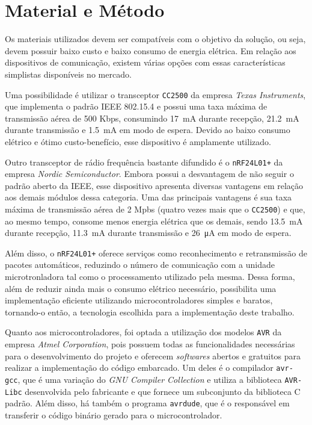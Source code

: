 \documentclass[
    12pt,               %
    a4paper,            %
    english,            %
    brazil,             %
    ]{article}
\begin{document}
\section{Material e Método}

Os materiais utilizados devem ser compatíveis com o objetivo da solução, ou seja, devem possuir baixo custo e baixo consumo de
energia elétrica. Em relação aos dispositivos de comunicação, existem várias opções com essas características simplistas
disponíveis no mercado.

Uma possibilidade é utilizar o transceptor \texttt{CC2500} da empresa \textit{Texas Instruments}, que implementa o padrão IEEE
802.15.4 e possui uma taxa máxima de transmissão aérea de 500 Kbps, consumindo \SI{17}{\milli \ampere} durante recepção,
\SI{21.2}{\milli \ampere} durante transmissão e \SI{1.5}{\milli \ampere} em modo de espera. Devido ao baixo consumo elétrico e
ótimo custo-benefício, esse dispositivo é amplamente utilizado. \cite{ccdatasheet}

Outro transceptor de rádio frequência bastante difundido é o \texttt{nRF24L01+} da empresa \textit{Nordic Semiconductor}. Embora
possui a desvantagem de não seguir o padrão aberto da IEEE, esse dispositivo apresenta diversas vantagens em relação aos demais
módulos dessa categoria. Uma das principais vantagens é sua taxa máxima de transmissão aérea de 2 Mpbs (quatro vezes mais que o
\texttt{CC2500}) e que, ao mesmo tempo, consome menos energia elétrica que os demais, sendo \SI{13.5}{\milli \ampere} durante
recepção, \SI{11.3}{\milli \ampere} durante transmissão e \SI{26}{\micro \ampere} em modo de espera.  \cite{nrfdatasheet}

Além disso, o \texttt{nRF24L01+} oferece serviços como reconhecimento e retransmissão de pacotes automáticos, reduzindo o número
de comunicação com a unidade microtronladora tal como o processamento utilizado pela mesma. Dessa forma, além de reduzir ainda
mais o consumo elétrico necessário, possibilita uma implementação eficiente utilizando microcontroladores simples e baratos,
tornando-o então, a tecnologia escolhida para a implementação deste trabalho.

Quanto aos microcontroladores, foi optada a utilização dos modelos \texttt{AVR} da empresa \textit{Atmel Corporation}, pois
possuem todas as funcionalidades necessárias para o desenvolvimento do projeto e oferecem \textit{softwares} abertos e gratuitos
para realizar a implementação do código embarcado. Um deles é o compilador \texttt{avr-gcc}, que é uma variação do \textit{GNU
Compiler Collection} e utiliza a biblioteca \texttt{AVR-Libc} desenvolvida pelo fabricante e que fornece um subconjunto da
biblioteca C padrão. Além disso, há também o programa \texttt{avrdude}, que é o responsável em transferir o código binário gerado
para o microcontrolador.
\end{document}
